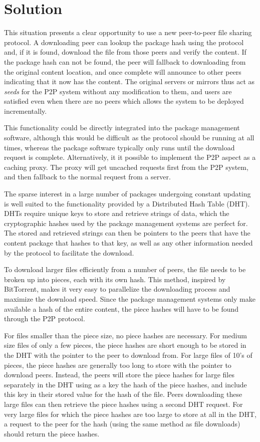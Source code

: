 \documentclass{sig-alt-release2}
\begin{document}
\section{Solution}

This situation presents a clear opportunity to use a new
peer-to-peer file sharing protocol.
A downloading peer can lookup the package hash using the protocol and, if it
is found, download the file from those peers and verify the content.
If the package hash can not be found, the peer will
fallback to downloading from the original content location, and once
complete will announce to other peers indicating that it now has
the content. The original servers or mirrors thus act as \emph{seeds} for the
P2P system without any modification to them, and users are satisfied even when
there are no peers which allows the system to be deployed incrementally.

This functionality could be directly integrated into the
package management software, although this would be
difficult as the protocol should be running at all times, whereas the
package software typically only runs until the download request is complete.
Alternatively, it
it possible to implement the P2P aspect as a caching
proxy. The proxy will get uncached requests first from the P2P system,
and then fallback to the normal request from a server.

The sparse interest in a large
number of packages undergoing constant updating is well suited to
the functionality provided by a Distributed Hash Table (DHT). DHTs
require unique keys to store and retrieve strings of data, which the
cryptographic hashes used by the package management systems are
perfect for. The stored and retrieved strings can then be pointers
to the peers that have the content package that hashes to that key,
as well as any other information needed by the protocol to facilitate
the download.

To download larger files efficiently from a number of peers,
the file needs to be broken up into pieces, each with its own hash.
This method, inspired by BitTorrent, makes it very easy to
parallelize the downloading process and maximize the download speed.
Since the package management systems only make
available a hash of the entire content, the piece hashes will have
to be found through the P2P protocol.

For files smaller than the piece size, no piece hashes are
necessary. For medium size files of only a few pieces, the piece
hashes are short enough to be stored in the DHT with the pointer to
the peer to download from. For large files of 10's of pieces, the
piece hashes are generally too long to store with the pointer to
download peers. Instead, the peers will store the piece hashes for
large files separately in the DHT using as a key the hash of the
piece hashes, and include this key in their stored value for the
hash of the file. Peers downloading these large files can then
retrieve the piece hashes using a second DHT request. For very large
files for which the piece hashes are too large to store at all in
the DHT, a request to the peer for the hash (using the same method
as file downloads) should return the piece hashes.
\end{document}
